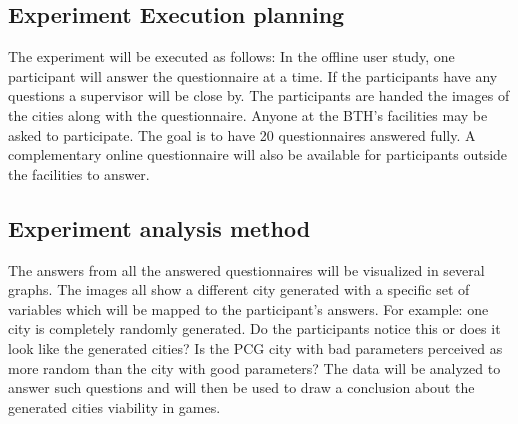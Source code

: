 		
	\subsection{Experiment Execution planning}
	The experiment will be executed as follows: In the offline user study, one participant will answer the questionnaire at a time. If the participants have any questions a supervisor will be close by. The participants are handed the images of the cities along with the questionnaire. Anyone at the BTH’s facilities may be asked to participate. The goal is to have 20 questionnaires answered fully. A complementary online questionnaire will also be available for participants outside the facilities to answer.
		
	\subsection{Experiment analysis method}
	The answers from all the answered questionnaires will be visualized in several graphs. The images all show a different city generated with a specific set of variables which will be mapped to the participant’s answers. For example: one city is completely randomly generated. Do the participants notice this or does it look like the generated cities? Is the PCG city with bad parameters perceived as more random than the city with good parameters? The data will be analyzed to answer such questions and will then be used to draw a conclusion about the generated cities viability in games.
	
	
	
	